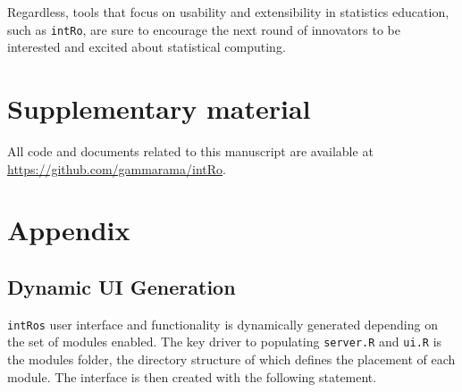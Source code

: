 \documentclass[12pt,]{article}
\begin{document}
Regardless, tools that focus on usability and extensibility in
statistics education, such as \texttt{intRo}, are sure to encourage the
next round of innovators to be interested and excited about statistical
computing.

\section{Supplementary material}\label{supplementary-material}

All code and documents related to this manuscript are available at
\url{https://github.com/gammarama/intRo}.

\section{Appendix}\label{appendix}

\subsection{Dynamic UI Generation}\label{dynamic-ui-generation}

\texttt{intRo\textquotesingle{}s} user interface and functionality is
dynamically generated depending on the set of modules enabled. The key
driver to populating \texttt{server.R} and \texttt{ui.R} is the modules
folder, the directory structure of which defines the placement of each
module. The interface is then created with the following statement.

\footnotesize
\end{document}
